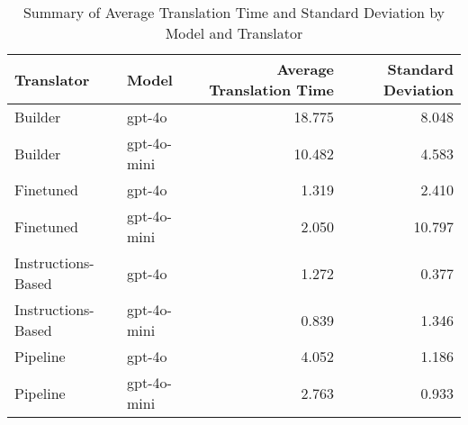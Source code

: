 \begin{table}
\caption{Summary of Average Translation Time and Standard Deviation by Model and Translator}
\label{tab:average_translation_time_summary}
\begin{tabular}{llrr}
\toprule
Translator & Model & Average Translation Time & Standard Deviation \\
\midrule
Builder & gpt-4o & 18.775 & 8.048 \\
Builder & gpt-4o-mini & 10.482 & 4.583 \\
Finetuned & gpt-4o & 1.319 & 2.410 \\
Finetuned & gpt-4o-mini & 2.050 & 10.797 \\
Instructions-Based & gpt-4o & 1.272 & 0.377 \\
Instructions-Based & gpt-4o-mini & 0.839 & 1.346 \\
Pipeline & gpt-4o & 4.052 & 1.186 \\
Pipeline & gpt-4o-mini & 2.763 & 0.933 \\
\bottomrule
\end{tabular}
\end{table}
